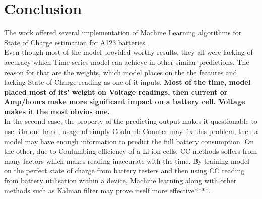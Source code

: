 \section{Conclusion}\label{sec:conclussion}
The work offered several implementation of Machine Learning algorithms for State of Charge estimation for A123 batteries. \\ [2pc]

Even though most of the model provided worthy results, they all were lacking of accuracy which Time-series model can achieve in other similar predictions.
The reason for that are the weights, which model places on the the features and lacking State of Charge reading as one of it inputs.
\textbf{Most of the time, model placed most of its' weight on Voltage readings, then current or Amp/hours make more significant impact on a battery cell. Voltage makes it the most obvios one.}\\
In the second case, the property of the predicting output makes it questionable to use.
On one hand, usage of simply Coulumb Counter may fix this problem, then a model may have enough information to predict the full battery consumption. On the other, due to Coulumbing efficiency of a Li-ion cells, CC methods soffers from many factors which makes reading inaccurate with the time. By training model on the perfect state of charge from battery testers and then using CC reading from battery utilisation within a device, Machine learning along with other methods such as Kalman filter may prove itself more effective****.
